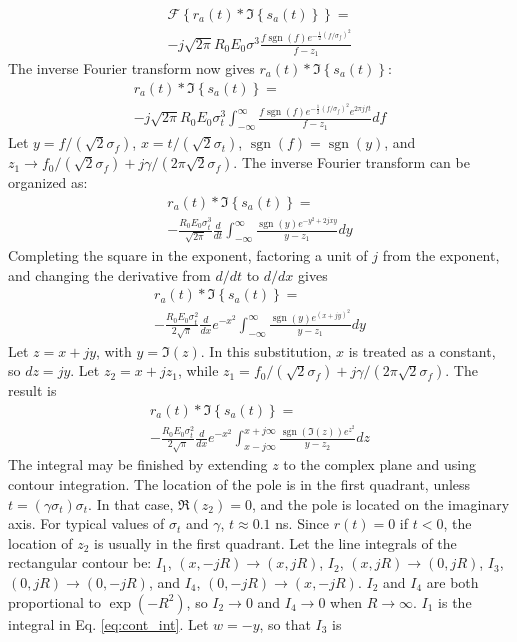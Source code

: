 \documentclass[amsmath,amssymb,aps,prd,10pt,twocolumn,showkeys]{revtex4}
\DeclareMathOperator{\sgn}{sgn}
\begin{document}
\begin{itemize}
\begin{multline}
\mathcal{F}\left\lbrace r_a(t) * \Im\left\lbrace s_a(t)\right\rbrace \right\rbrace = \\ -j \sqrt{2\pi} R_0 E_0 \sigma^3 \frac{f\sgn(f) e^{-\frac{1}{2}(f/\sigma_f)^2}}{f-z_1}
\end{multline}
The inverse Fourier transform now gives $r_a(t) * \Im\left\lbrace s_a(t) \right\rbrace$:
\begin{multline}
r_a(t) * \Im\left\lbrace s_a(t) \right\rbrace = \\
-j\sqrt{2\pi} R_0 E_0 \sigma_t^3 \int_{-\infty}^{\infty} \frac{f\sgn(f)e^{-\frac{1}{2}(f/\sigma_f)^2}e^{2\pi jft}}{f-z_1} df
\end{multline}
Let $y = f/(\sqrt{2}\sigma_f)$, $x=t/(\sqrt{2}\sigma_t)$, $\sgn(f) = \sgn(y)$, and $z_1 \to f_0/(\sqrt{2}\sigma_f) + j\gamma/(2\pi \sqrt{2} \sigma_f)$.  The inverse Fourier transform can be organized as:
\begin{multline}
r_a(t) * \Im\left\lbrace s_a(t) \right\rbrace = \\
-\frac{R_0E_0\sigma_t^3}{\sqrt{2\pi}}\frac{d}{dt}\int_{-\infty}^{\infty} \frac{\sgn(y) e^{-y^2+2jxy}}{y-z_1} dy
\end{multline}
Completing the square in the exponent, factoring a unit of $j$ from the exponent, and changing the derivative from $d/dt$ to $d/dx$ gives
\begin{multline}
r_a(t) * \Im\left\lbrace s_a(t) \right\rbrace = \\
-\frac{R_0E_0\sigma_t^2}{2\sqrt{\pi}}\frac{d}{dx}e^{-x^2} \int_{-\infty}^{\infty} \frac{\sgn(y) e^{(x+jy)^2}}{y-z_1}dy
\end{multline}
Let $z = x+jy$, with $y = \Im(z)$.  In this substitution, $x$ is treated as a constant, so $dz = jy$.  Let $z_2 = x+j z_1$, while $z_1 = f_0/(\sqrt{2}\sigma_f) + j\gamma/(2\pi \sqrt{2} \sigma_f)$.  The result is
\begin{multline}
r_a(t) * \Im\left\lbrace s_a(t) \right\rbrace = \\
-\frac{R_0E_0\sigma_t^2}{2\sqrt{\pi}}\frac{d}{dx}e^{-x^2} \int_{x-j\infty}^{x+j\infty} \frac{\sgn(\Im(z)) e^{z^2}}{y-z_2}dz \label{eq:cont_int}
\end{multline}
The integral may be finished by extending $z$ to the complex plane and using contour integration.  The location of the pole is in the first quadrant, unless $t = (\gamma \sigma_t)\sigma_t$.  In that case, $\Re(z_2)=0$, and the pole is located on the imaginary axis.  For typical values of $\sigma_t$ and $\gamma$, $t\approx 0.1$ ns. Since $r(t)=0$ if $t<0$, the location of $z_2$ is usually in the first quadrant.  Let the line integrals of the rectangular contour be: $I_1$, $(x,-jR) \to (x,jR)$, $I_2$, $(x,jR) \to (0,jR)$, $I_3$, $(0,jR) \to (0,-jR)$, and $I_4$, $(0,-jR) \to (x,-jR)$.  $I_2$ and $I_4$ are both proportional to $\exp(-R^2)$, so $I_2 \to 0$ and $I_4 \to 0$ when $R \to \infty$.  $I_1$ is the integral in Eq. \ref{eq:cont_int}.  Let $w = -y$, so that $I_3$ is

\end{itemize}
\end{document}
